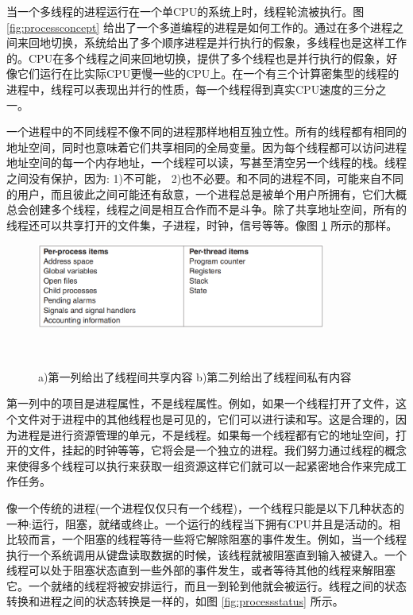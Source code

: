 	当一个多线程的进程运行在一个单CPU的系统上时，线程轮流被执行。图 \ref{fig:processconcept} 给出了一个多道编程的进程是如何工作的。通过在多个进程之间来回地切换，系统给出了多个顺序进程是并行执行的假象，多线程也是这样工作的。CPU在多个线程之间来回地切换，提供了多个线程也是并行执行的假象，好像它们运行在比实际CPU更慢一些的CPU上。在一个有三个计算密集型的线程的进程中，线程可以表现出并行的性质，每一个线程得到真实CPU速度的三分之一。
	
	一个进程中的不同线程不像不同的进程那样地相互独立性。所有的线程都有相同的地址空间，同时也意味着它们共享相同的全局变量。因为每个线程都可以访问进程地址空间的每一个内存地址，一个线程可以读，写甚至清空另一个线程的栈。线程之间没有保护，因为: 1)不可能， 2)也不必要。和不同的进程不同，可能来自不同的用户，而且彼此之间可能还有敌意，一个进程总是被单个用户所拥有，它们大概总会创建多个线程，线程之间是相互合作而不是斗争。除了共享地址空间，所有的线程还可以共享打开的文件集，子进程，时钟，信号等等。像图 \ref{fig:sharecontents} 所示的那样。

	\begin{figure}[ht]\small
		\centering
		\includegraphics[width=0.85\textwidth]{FIG/2-12.png}
		\caption{a)第一列给出了线程间共享内容 b)第二列给出了线程间私有内容}　\label{fig:sharecontents}
	\end{figure}
	
	第一列中的项目是进程属性，不是线程属性。例如，如果一个线程打开了文件，这个文件对于进程中的其他线程也是可见的，它们可以进行读和写。这是合理的，因为进程是进行资源管理的单元，不是线程。如果每一个线程都有它的地址空间，打开的文件，挂起的时钟等等，它将会是一个独立的进程。我们努力通过线程的概念来使得多个线程可以执行来获取一组资源这样它们就可以一起紧密地合作来完成工作任务。
	
	像一个传统的进程(一个进程仅仅只有一个线程)，一个线程只能是以下几种状态的一种:运行，阻塞，就绪或终止。一个运行的线程当下拥有CPU并且是活动的。相比较而言，一个阻塞的线程等待一些将它解除阻塞的事件发生。例如，当一个线程执行一个系统调用从键盘读取数据的时候，该线程就被阻塞直到输入被键入。一个线程可以处于阻塞状态直到一些外部的事件发生，或者等待其他的线程来解阻塞它。一个就绪的线程将被安排运行，而且一到轮到他就会被运行。线程之间的状态转换和进程之间的状态转换是一样的，如图 \ref{fig:processstatus} 所示。
	
